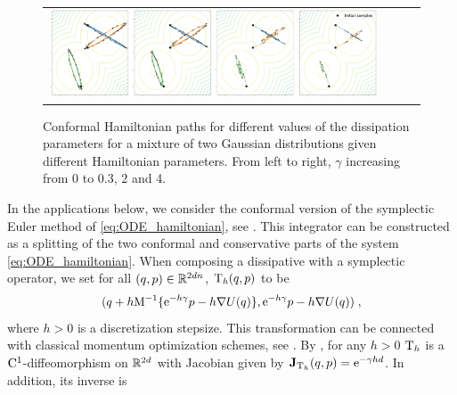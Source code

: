 \documentclass{article}
\begin{document}
 \begin{figure}[h!]
     \centering
\begin{tabular}{cccc}
     \includegraphics[width=1\linewidth]{pics/bigplot.pdf}
\end{tabular}
     \caption{Conformal Hamiltonian paths for different values of the dissipation parameters for a mixture of two Gaussian distributions given different Hamiltonian parameters. From left to right, $\gamma$ increasing from 0 to 0.3, 2 and 4.}
     \label{fig:toy_example_posterior}
 \end{figure}
In the applications below, we consider the conformal version of the symplectic Euler method of \eqref{eq:ODE_hamiltonian}, see \cite{francca2019conformal}.
This integrator can be constructed as a splitting of the two conformal and conservative parts of the system \eqref{eq:ODE_hamiltonian}. When composing a dissipative with a  symplectic operator, we set for all $(q,p) \in \mathbb{R}^{2dn}$, $\operatorname{T}_h(q,p)$ to be
 \[%
 (q+h\mass^{-1}\{ \rme^{-h\gamma} p -h \nabla U(q)\},%
 \rme^{-h \gamma } p -h \nabla U(q))\eqsp,
\]%
where $h >0$ is a discretization stepsize.
This transformation can be connected with classical momentum optimization schemes, see \citep[Section 4]{francca2019conformal}.
By \citep[Section 3]{francca2019conformal}, for any $h >0$ $\operatorname{T}_h$ is a $\mathrm{C}^1$-diffeomorphism on $\mathbb{R}^{2d}$ with Jacobian given by $\mathbf{J}_{\operatorname{T}_h}(q,p) = \mathrm{e}^{-\gamma h d}$. In addition,  its inverse is
\end{document}
